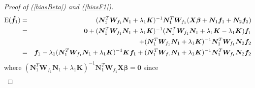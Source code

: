 \documentclass[review]{elsarticle}
\begin{document}
\begin{proof} [Proof of (\ref{biasBeta}) and (\ref{biasF1})]
\begin{eqnarray*}
    {\rm E}(\boldsymbol {\hat f}_1) 
&=&
(\boldsymbol N_1^T 
\boldsymbol W_{f_1}  \boldsymbol N_1
  + \lambda_1 \boldsymbol K)^{-1}  \boldsymbol N_1^T \boldsymbol W_{f_1}
(\boldsymbol X \boldsymbol \beta + \boldsymbol N_{1} \boldsymbol f_1 + 
  \boldsymbol N_{2} \boldsymbol f_2) \\ 
   &=&
\boldsymbol 0 
 + (\boldsymbol N_1^T \boldsymbol W_{f_1}  \boldsymbol N_1 + \lambda_1 \boldsymbol K)^{-1}  
(\boldsymbol N_1^T \boldsymbol W_{f_1} \boldsymbol N_{1}+ \lambda_1 \boldsymbol K
 - \lambda_1 \boldsymbol K)
  \boldsymbol f_1\\
&&\quad\quad\quad\quad\quad
+ 
(\boldsymbol N_1^T \boldsymbol W_{f_1}  \boldsymbol N_1
+ 
 \lambda_1 \boldsymbol K)^{-1}  \boldsymbol N_1^T \boldsymbol W_{f_1}
\boldsymbol N_{2} \boldsymbol f_2\\
     &=&
\boldsymbol f_1 
- \lambda_1 
(\boldsymbol N_1^T \boldsymbol W_{f_1}  \boldsymbol N_1 +  \lambda_1 \boldsymbol K)^{-1}   \boldsymbol K \boldsymbol f_1
+ 
(\boldsymbol N_1^T \boldsymbol W_{f_1}  \boldsymbol N_1 +  \lambda_1 \boldsymbol K)^{-1}  \boldsymbol N_1^T \boldsymbol W_{f_1}
\boldsymbol N_{2} \boldsymbol f_2 
\end{eqnarray*}
where
$(\boldsymbol N_1^T \boldsymbol W_{f_1}  \boldsymbol N_1
  + \lambda_1 \boldsymbol K)^{-1}  \boldsymbol N_1^T \boldsymbol W_{f_1}
  \boldsymbol X \boldsymbol \beta =  \boldsymbol 0$ 
since 
\begin{eqnarray*}

\end{eqnarray*}
\end{proof}
\end{document}
